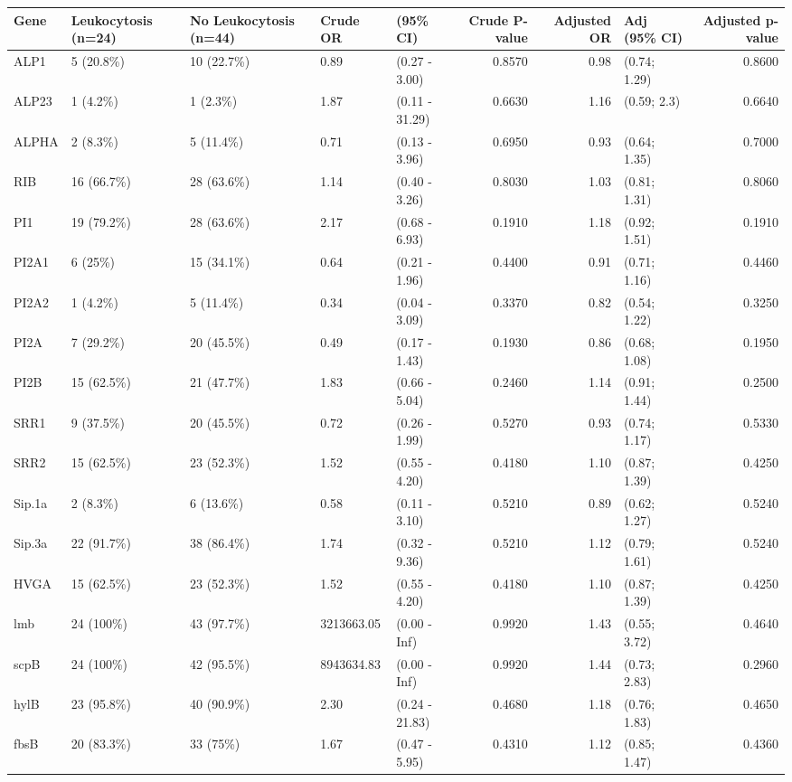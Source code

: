 \begin{table}[ht]
\centering
\begin{tabular}{lllllrrlr}
  \hline
Gene & Leukocytosis (n=24) & No Leukocytosis (n=44) & Crude OR & (95\% CI) & Crude P-value & Adjusted OR & Adj (95\% CI) & Adjusted p-value \\ 
  \hline
ALP1 & 5 (20.8\%) & 10 (22.7\%) & 0.89 & (0.27 - 3.00) & 0.8570 & 0.98 & (0.74; 1.29) & 0.8600 \\ 
  ALP23 & 1 (4.2\%) & 1 (2.3\%) & 1.87 & (0.11 - 31.29) & 0.6630 & 1.16 & (0.59; 2.3) & 0.6640 \\ 
  ALPHA & 2 (8.3\%) & 5 (11.4\%) & 0.71 & (0.13 - 3.96) & 0.6950 & 0.93 & (0.64; 1.35) & 0.7000 \\ 
  RIB & 16 (66.7\%) & 28 (63.6\%) & 1.14 & (0.40 - 3.26) & 0.8030 & 1.03 & (0.81; 1.31) & 0.8060 \\ 
  PI1 & 19 (79.2\%) & 28 (63.6\%) & 2.17 & (0.68 - 6.93) & 0.1910 & 1.18 & (0.92; 1.51) & 0.1910 \\ 
  PI2A1 & 6 (25\%) & 15 (34.1\%) & 0.64 & (0.21 - 1.96) & 0.4400 & 0.91 & (0.71; 1.16) & 0.4460 \\ 
  PI2A2 & 1 (4.2\%) & 5 (11.4\%) & 0.34 & (0.04 - 3.09) & 0.3370 & 0.82 & (0.54; 1.22) & 0.3250 \\ 
  PI2A & 7 (29.2\%) & 20 (45.5\%) & 0.49 & (0.17 - 1.43) & 0.1930 & 0.86 & (0.68; 1.08) & 0.1950 \\ 
  PI2B & 15 (62.5\%) & 21 (47.7\%) & 1.83 & (0.66 - 5.04) & 0.2460 & 1.14 & (0.91; 1.44) & 0.2500 \\ 
  SRR1 & 9 (37.5\%) & 20 (45.5\%) & 0.72 & (0.26 - 1.99) & 0.5270 & 0.93 & (0.74; 1.17) & 0.5330 \\ 
  SRR2 & 15 (62.5\%) & 23 (52.3\%) & 1.52 & (0.55 - 4.20) & 0.4180 & 1.10 & (0.87; 1.39) & 0.4250 \\ 
  Sip.1a & 2 (8.3\%) & 6 (13.6\%) & 0.58 & (0.11 - 3.10) & 0.5210 & 0.89 & (0.62; 1.27) & 0.5240 \\ 
  Sip.3a & 22 (91.7\%) & 38 (86.4\%) & 1.74 & (0.32 - 9.36) & 0.5210 & 1.12 & (0.79; 1.61) & 0.5240 \\ 
  HVGA & 15 (62.5\%) & 23 (52.3\%) & 1.52 & (0.55 - 4.20) & 0.4180 & 1.10 & (0.87; 1.39) & 0.4250 \\ 
  lmb & 24 (100\%) & 43 (97.7\%) & 3213663.05 & (0.00 - Inf) & 0.9920 & 1.43 & (0.55; 3.72) & 0.4640 \\ 
  scpB & 24 (100\%) & 42 (95.5\%) & 8943634.83 & (0.00 - Inf) & 0.9920 & 1.44 & (0.73; 2.83) & 0.2960 \\ 
  hylB & 23 (95.8\%) & 40 (90.9\%) & 2.30 & (0.24 - 21.83) & 0.4680 & 1.18 & (0.76; 1.83) & 0.4650 \\ 
  fbsB & 20 (83.3\%) & 33 (75\%) & 1.67 & (0.47 - 5.95) & 0.4310 & 1.12 & (0.85; 1.47) & 0.4360 \\ 
   \hline
\end{tabular}
\end{table}
